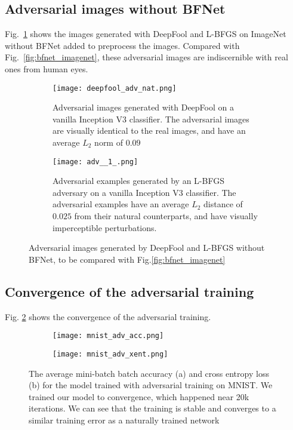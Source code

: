 \documentclass{article} %
\begin{document}
\subsection{Adversarial images without BFNet}
Fig.~\ref{fig:nonbf_imagenet} shows the images generated with DeepFool and L-BFGS on ImageNet without BFNet added to preprocess the images. Compared with Fig.~\ref{fig:bfnet_imagenet}, these adversarial images are indiscernible with real ones from human eyes.
\begin{figure}[htb]
\begin{subfigure}{\textwidth}
  \centering
  \texttt{[image: deepfool\_adv\_nat.png]}
  \caption{\small Adversarial images generated with DeepFool on a vanilla Inception V3 classifier. The adversarial images are visually identical to the real images, and have an average $L_2$ norm of $0.09$}
\end{subfigure}
\vskip -0.05in
\begin{subfigure}{\textwidth}
  \centering
  \texttt{[image: adv\_\_1\_.png]}
  \caption{\small Adversarial examples generated by an L-BFGS adversary on a vanilla Inception V3 classifier. The adversarial examples have an average $L_2$ distance of $0.025$ from their natural counterparts, and have visually imperceptible perturbations. }
  \end{subfigure}
  \vskip -0.05in
  \caption{Adversarial images generated by DeepFool and L-BFGS without BFNet, to be compared with Fig.\ref{fig:bfnet_imagenet}}
  \label{fig:nonbf_imagenet}
\end{figure}
\subsection{Convergence of the adversarial training}
Fig. \ref{fig:mnist_acc} shows the convergence of the adversarial training.
\begin{figure}[htb]
\centering
\begin{subfigure}{.5\textwidth}
  \centering
  \texttt{[image: mnist\_adv\_acc.png]}
  \caption{}
\end{subfigure}%
\begin{subfigure}{.5\textwidth}
  \centering
  \texttt{[image: mnist\_adv\_xent.png]}
  \caption{}
\end{subfigure}
\caption{The average mini-batch batch accuracy (a) and cross entropy loss (b) for the model trained with adversarial training on MNIST. We trained our model to convergence, which happened near 20k iterations. We can see that the training is stable and converges to a similar training error as a naturally trained network}\label{fig:mnist_acc}
\end{figure}
\end{document}
